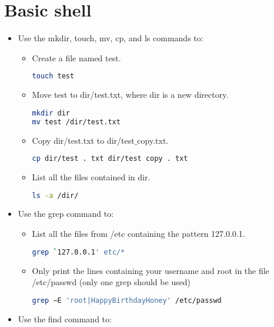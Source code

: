 \documentclass{article}
\begin{document}
\section{Basic shell}
\begin{itemize}
\item Use the mkdir, touch, mv, cp, and ls commands to:\\
\begin{itemize}
\item Create a file named test.\\
\begin{lstlisting}[language=bash]
touch test
\end{lstlisting}
\item Move test to dir/test.txt, where dir is a new directory.\\
\begin{lstlisting}[language=bash]
mkdir dir
mv test /dir/test.txt
\end{lstlisting}
\item Copy dir/test.txt to dir/test$\_$copy.txt.\\
\begin{lstlisting}[language=bash]
cp dir/test . txt dir/test copy . txt
\end{lstlisting}
\item List all the files contained in dir.\\
\begin{lstlisting}[language=bash]
ls -a /dir/
\end{lstlisting}
\end{itemize}
\item Use the grep command to:\\
\begin{itemize}
\item List all the files from /etc containing the pattern 127.0.0.1.\\
\begin{lstlisting}[language=bash]
grep `127.0.0.1' etc/*
\end{lstlisting}
\item Only print the lines containing your username and root in the file /etc/passwd (only one grep
should be used)\\
\begin{lstlisting}[language=bash]
grep −E 'root|HappyBirthdayHoney' /etc/passwd
\end{lstlisting}
\end{itemize}
\item Use the find command to:\\

\end{itemize}
\end{document}

